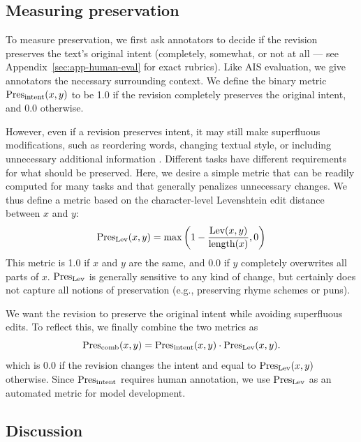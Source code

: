 \documentclass[11pt]{article}
\begin{document}
\subsection{Measuring preservation}\label{sec:preservation}

To measure preservation, we first ask annotators to decide if the revision preserves the text's original intent (completely, somewhat, or not at all --- see Appendix~\ref{sec:app-human-eval} for exact rubrics).
Like AIS evaluation, we give annotators the necessary surrounding context.
We define the binary metric $\text{Pres}_\text{intent}(x, y)$ to be 1.0 if the revision completely preserves the original intent, and 0.0 otherwise.

However, even if a revision preserves intent, it may still make superfluous modifications, such as reordering words, changing textual style, or including unnecessary additional information \cite{thorne2021evidence}. Different tasks have different requirements for what should be preserved. Here, we desire a simple metric that can be readily computed for many tasks and that generally penalizes unnecessary changes.
We thus define a metric based on the character-level Levenshtein edit distance \cite{levenshtein1966binary} %
between $x$ and $y$:
\begin{equation}
\text{Pres}_\text{Lev}(x, y) = \max\left(1 - \frac{\text{{Lev}}(x, y)}{\text{{length}}(x)}, 0\right)
\end{equation}
This metric is 1.0 if $x$ and $y$ are the same, and 0.0 if $y$ completely overwrites all parts of $x$. $\text{Pres}_\text{Lev}$ is generally sensitive to any kind of change, but certainly does not capture all notions of preservation (e.g., preserving rhyme schemes or puns).

We want the revision to preserve the original intent while avoiding superfluous edits. To reflect this, we finally combine the two metrics as
\begin{equation}
\text{Pres}_\text{comb}(x, y) = \text{Pres}_\text{intent}(x, y) \cdot \text{Pres}_\text{Lev}(x, y).
\end{equation}
which is 0.0 if the revision changes the intent and equal to $\text{Pres}_\text{Lev}(x, y)$ otherwise.
Since $\text{Pres}_\text{intent}$ requires human annotation,
we use $\text{Pres}_\text{Lev}$ as an automated metric for model development.






\subsection{Discussion}
\end{document}
